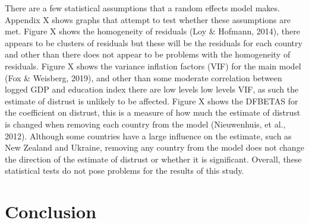 \documentclass[
  11pt,
]{article}
\begin{document}
There are a few statistical assumptions that a random effects model makes. Appendix X shows graphs that attempt to test whether these assumptions are met. Figure X shows the homogeneity of residuals (Loy \& Hofmann, 2014), there appears to be clusters of residuals but these will be the residuals for each country and other than there does not appear to be problems with the homogeneity of residuals. Figure X shows the variance inflation factors (VIF) for the main model (Fox \& Weisberg, 2019), and other than some moderate correlation between logged GDP and education index there are low levels low levels VIF, as such the estimate of distrust is unlikely to be affected. Figure X shows the DFBETAS for the coefficient on distrust, this is a measure of how much the estimate of distrust is changed when removing each country from the model (Nieuwenhuis, et al., 2012). Although some countries have a large influence on the estimate, such as New Zealand and Ukraine, removing any country from the model does not change the direction of the estimate of distrust or whether it is significant. Overall, these statistical tests do not pose problems for the results of this study.\\

\hypertarget{conclusion}{%
\section{Conclusion}\label{conclusion}}
\end{document}
